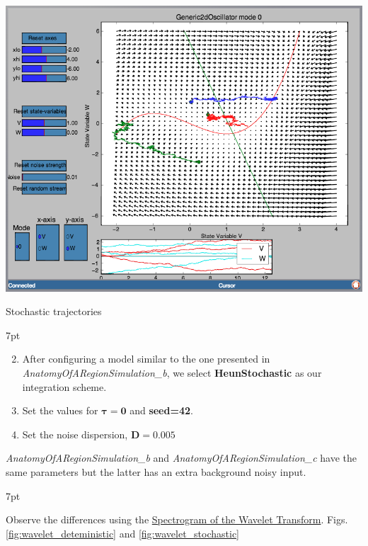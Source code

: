 \documentclass{tufte-handout}
\newenvironment{formal}{%
  \def\FrameCommand{%
    \hspace{1pt}%
    {\color{DarkBlue}\vrule width 2pt}%
    {\color{formalshade}\vrule width 4pt}%
    \colorbox{formalshade}%
  }%
  \MakeFramed{\advance\hsize-\width\FrameRestore}%
  \noindent\hspace{-4.55pt}%
  \begin{adjustwidth}{}{7pt}%
  \vspace{2pt}\vspace{2pt}%
}
{%
  \vspace{2pt}\end{adjustwidth}\endMakeFramed%
}
\newenvironment{simulation}{%
  \def\FrameCommand{%
    \hspace{1pt}%
    {\color{ForestGreen}\vrule width 2pt}%
    {\color{simulationshade}\vrule width 4pt}%
    \colorbox{simulationshade}%
  }%
  \MakeFramed{\advance\hsize-\width\FrameRestore}%
  \noindent\hspace{-4.55pt}%
  \begin{adjustwidth}{}{7pt}%
  \vspace{2pt}\vspace{2pt}%
}
{%
  \vspace{2pt}\end{adjustwidth}\endMakeFramed%
}
\begin{document}
\begin{marginfigure}%
\includegraphics[width=\linewidth]{Handout_UI_BuildingYourOwnBrainNetworkModel_PPI}%
  \caption{Stochastic trajectories}%
  \label{fig:ppi_noise}%
\end{marginfigure}

\begin{simulation}
\begin{enumerate}[resume]
\setcounter{enumi}{1}
\item After configuring a model similar to the one presented in  \textit{AnatomyOfARegionSimulation\_b}, we select \textbf{HeunStochastic} as our integration scheme.  
\item Set the values for {$\boldsymbol{\tau=0}$}  and \textbf{seed=42}. 
\item Set the noise dispersion, $\mathbf{D=0.005}$
\end{enumerate}
\end{simulation}
\newpage
\textit{AnatomyOfARegionSimulation\_b} and \textit{AnatomyOfARegionSimulation\_c} have the same parameters but the latter has an extra background noisy input. 

\begin{formal}
\begin{enumerate}
Observe the differences using the \underline{Spectrogram of the Wavelet Transform}. Figs. \ref{fig:wavelet_deteministic} and \ref{fig:wavelet_stochastic}
\end{enumerate}
\end{formal}
\end{document}
